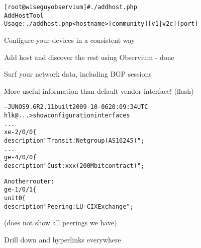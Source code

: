 \documentclass[28pt,landscape,a4paper,footrule]{foils}
\begin{document}


\begin{alltt}
[root@wiseguy observium]# ./addhost.php 
Add Host Tool
Usage: ./addhost.php <hostname> [community] [v1|v2c] [port]
\end{alltt}

\begin{slidelist}
\item Configure your devices in a consistent way
\item Add host and discover the rest using Observium - done
\item Surf your network data, including BGP sessions
\end{slidelist}



\centerline{More useful information than default vendor interface! (flash)}



\begin{alltt}	
--- JUNOS 9.6R2.11 built 2009-10-06 20:09:34 UTC
hlk@ ...> show configuration interfaces 
...
xe-2/0/0 \{
    description "Transit: Netgroup (AS16245)";
...
ge-4/0/0 \{
    description "Cust: xxx (200Mbit contract)";

Another router:
ge-1/0/1 \{
    unit 0 \{
        description "Peering: LU-CIX Exchange";

\end{alltt}
\centerline{}





\centerline{(does not show all peerings we have)}



\centerline{Drill down and hyperlinks everywhere}




\end{document}
